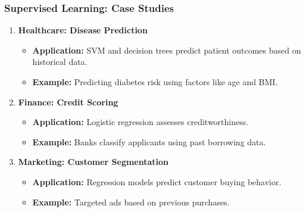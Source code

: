 \documentclass{beamer}
\begin{document}
\begin{frame}[fragile]
    \frametitle{Supervised Learning: Case Studies}
    \begin{enumerate}
        \item \textbf{Healthcare: Disease Prediction}
            \begin{itemize}
                \item \textbf{Application:} SVM and decision trees predict patient outcomes based on historical data.
                \item \textbf{Example:} Predicting diabetes risk using factors like age and BMI.
            \end{itemize}
        
        \item \textbf{Finance: Credit Scoring}
            \begin{itemize}
                \item \textbf{Application:} Logistic regression assesses creditworthiness.
                \item \textbf{Example:} Banks classify applicants using past borrowing data.
            \end{itemize}
        
        \item \textbf{Marketing: Customer Segmentation}
            \begin{itemize}
                \item \textbf{Application:} Regression models predict customer buying behavior.
                \item \textbf{Example:} Targeted ads based on previous purchases.
            \end{itemize}
    \end{enumerate}
\end{frame}
\end{document}

